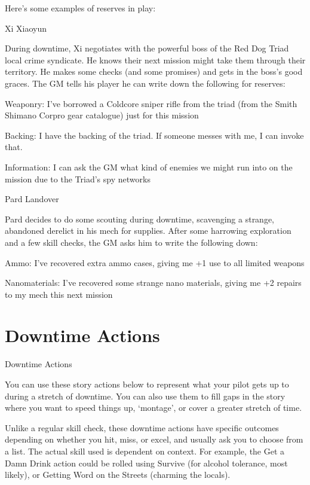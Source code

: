 Here’s some examples of reserves in play:


Xi Xiaoyun

During downtime, Xi negotiates with the powerful boss of the Red Dog Triad local crime
syndicate. He knows their next mission might take them through their territory. He makes some
checks (and some promises) and gets in the boss’s good graces. The GM tells his player he can
write down the following for reserves:

	        Weaponry: I’ve borrowed a Coldcore sniper rifle from the triad (from the Smith Shimano
Corpro gear catalogue) just for this mission

	        Backing: I have the backing of the triad. If someone messes with me, I can invoke that.

	        Information: I can ask the GM what kind of enemies we might run into on the mission
due to the Triad’s spy networks


Pard Landover

Pard decides to do some scouting during downtime, scavenging a strange, abandoned derelict
in his mech for supplies. After some harrowing exploration and a few skill checks, the GM asks
him to write the following down:

	        Ammo: I’ve recovered extra ammo cases, giving me +1 use to all limited weapons

	        Nanomaterials: I’ve recovered some strange nano materials, giving me +2 repairs to my
mech this next mission



\section{Downtime Actions}

                                           Downtime Actions


You can use these story actions below to represent what your pilot gets up to during a stretch of
downtime. You can also use them to fill gaps in the story where you want to speed things up,
‘montage’, or cover a greater stretch of time.


Unlike a regular skill check, these downtime actions have specific outcomes depending on
whether you hit, miss, or excel, and usually ask you to choose from a list. The actual skill used is
dependent on context. For example, the Get a Damn Drink action could be rolled using Survive
(for alcohol tolerance, most likely), or Getting Word on the Streets (charming the locals).


